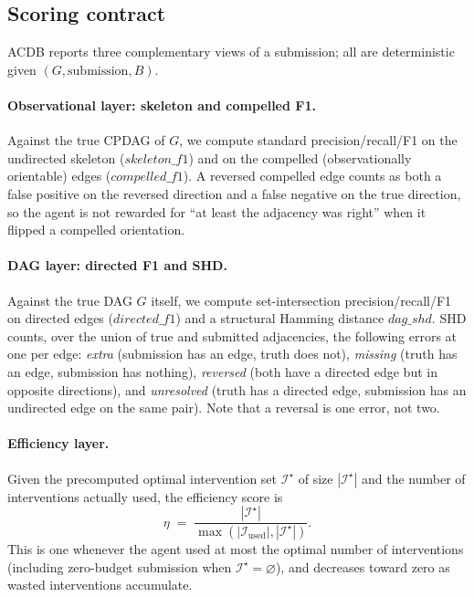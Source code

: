\subsection{Scoring contract}
\label{sec:scoring}

ACDB reports three complementary views of a submission; all are deterministic given $(G,\text{submission},B)$.

\paragraph{Observational layer: skeleton and compelled F1.} Against the true CPDAG of $G$, we compute standard precision/recall/F1 on the undirected skeleton ($\mathit{skeleton\_f1}$) and on the compelled (observationally orientable) edges ($\mathit{compelled\_f1}$). A reversed compelled edge counts as both a false positive on the reversed direction and a false negative on the true direction, so the agent is not rewarded for ``at least the adjacency was right'' when it flipped a compelled orientation.

\paragraph{DAG layer: directed F1 and SHD.} Against the true DAG $G$ itself, we compute set-intersection precision/recall/F1 on directed edges ($\mathit{directed\_f1}$) and a structural Hamming distance $\mathit{dag\_shd}$. SHD counts, over the union of true and submitted adjacencies, the following errors at one per edge: \emph{extra} (submission has an edge, truth does not), \emph{missing} (truth has an edge, submission has nothing), \emph{reversed} (both have a directed edge but in opposite directions), and \emph{unresolved} (truth has a directed edge, submission has an undirected edge on the same pair). Note that a reversal is one error, not two.

\paragraph{Efficiency layer.} Given the precomputed optimal intervention set $\mathcal{I}^\star$ of size $|\mathcal{I}^\star|$ and the number of interventions actually used, the efficiency score is
\begin{equation}
\eta \;=\; \frac{|\mathcal{I}^\star|}{\max(|\mathcal{I}_{\mathrm{used}}|, |\mathcal{I}^\star|)}.
\label{eq:efficiency}
\end{equation}
This is one whenever the agent used at most the optimal number of interventions (including zero-budget submission when $\mathcal{I}^\star = \varnothing$), and decreases toward zero as wasted interventions accumulate.

